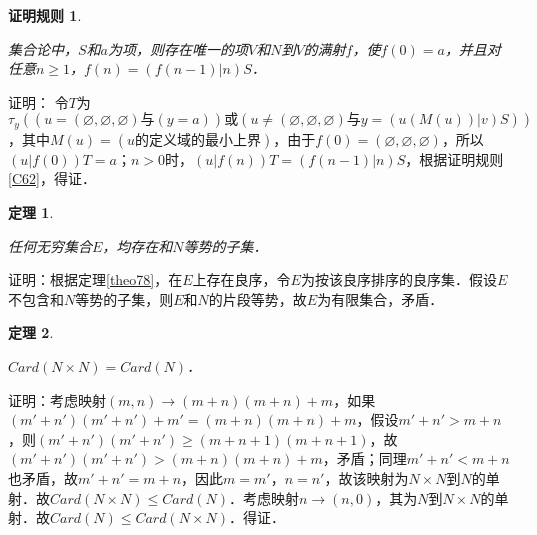 \documentclass[12pt, a4paper, oneside]{book}
\newtheorem{C}{证明规则}
\newtheorem{theo}{定理}
\begin{document}
			\begin{C}\label{C63}
				\hfill\par
				集合论中，$S$和$a$为项，则存在唯一的项$V$和$N$到$V$的满射$f$，使$f(0)=a$，并且对任意$n\geq 1$，$f(n)=(f(n-1)|n)S$．
			\end{C}
			证明：
			令$T$为$\tau_y((u=(\varnothing, \varnothing, \varnothing)\text{与}(y=a))\text{或}(u\neq (\varnothing, \varnothing, \varnothing)\text{与}y=(u(M(u))|v)S))$，其中$M(u)=(u\text{的定义域的最小上界})$，由于$f(0)=(\varnothing, \varnothing, \varnothing)$，所以$(u|f(0))T=a$；$n>0$时，$(u|f(n))T=(f(n-1)|n)S$，根据证明规则\ref{C62}，得证．
			
			\begin{theo}\label{theo154}
				\hfill\par
				任何无穷集合$E$，均存在和$N$等势的子集．
			\end{theo}
			证明：根据定理\ref{theo78}，在$E$上存在良序，令$E$为按该良序排序的良序集．假设$E$不包含和$N$等势的子集，则$E$和$N$的片段等势，故$E$为有限集合，矛盾．
						
			\begin{theo}\label{theo155}
				\hfill\par
				$Card(N\times N)=Card(N)$．
			\end{theo}
			证明：考虑映射$(m, n)\to (m+n)(m+n)+m$，如果$(m'+n')(m'+n')+m'=(m+n)(m+n)+m$，假设$m'+n'>m+n$，则$(m'+n')(m'+n')\geq (m+n+1)(m+n+1)$，故$(m'+n')(m'+n')>(m+n)(m+n)+m$，矛盾；同理$m'+n'<m+n$也矛盾，故$m'+n'=m+n$，因此$m=m'$，$n=n'$，故该映射为$N\times N$到$N$的单射．故$Card(N\times N)\leq Card(N)$．考虑映射$n\to (n, 0)$，其为$N$到$N\times N$的单射．故$Card(N)\leq Card(N\times N)$．得证．
\end{document}
